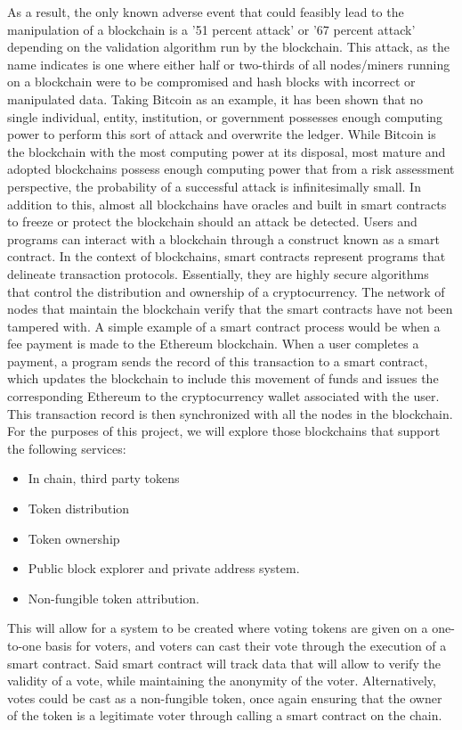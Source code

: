 \documentclass{article}
\begin{document}
\smallbreak
\noindent
As a result, the only known adverse event that could feasibly lead to the manipulation of a blockchain is a '51 percent attack' or '67 percent attack' depending on the validation algorithm run by the blockchain. This attack, as the name indicates is one where either half or two-thirds of all nodes/miners running on a blockchain were to be compromised and hash blocks with incorrect or manipulated data. Taking Bitcoin as an example, it has been shown that no single individual, entity, institution, or government possesses enough computing power to perform this sort of attack and overwrite the ledger. While Bitcoin is the blockchain with the most computing power at its disposal, most mature and adopted blockchains possess enough computing power that from  a risk assessment perspective, the probability of a successful attack is infinitesimally small. In addition to this, almost all blockchains have oracles and built in smart contracts to freeze or protect the blockchain should an attack be detected. 
\smallbreak
\noindent 
Users and programs can interact with a blockchain through a construct known as a smart contract.\cite{vox1} In the context of blockchains, smart contracts represent programs that delineate transaction protocols. Essentially, they are highly secure algorithms that control the distribution and ownership of a cryptocurrency. The network of nodes that maintain the blockchain verify that the smart contracts have not been tampered with.\cite{hawk1} A simple example of a smart contract process would be when a fee payment is made to the Ethereum blockchain. When a user completes a payment, a program sends the record of this transaction to a smart contract, which updates the blockchain to include this movement of funds and issues the corresponding Ethereum to the cryptocurrency wallet associated with the user. This transaction record is then synchronized with all the nodes in the blockchain.\cite{vox1}
\smallbreak \noindent
For the purposes of this project, we will explore those blockchains that support the following services:
\begin{itemize}
    \item In chain, third party tokens 
    \item Token distribution
    \item Token ownership
    \item Public block explorer and private address system.
    \item Non-fungible token attribution.
\end{itemize}
This will allow for a system to be created where voting tokens are given on a one-to-one basis for voters, and voters can cast their vote through the execution of a smart contract. Said smart contract will track data that will allow to verify the validity of a vote, while maintaining the anonymity of the voter. Alternatively, votes could be cast as a non-fungible token, once again ensuring that the owner of the token is a legitimate voter through calling a smart contract on the chain.
\end{document}
